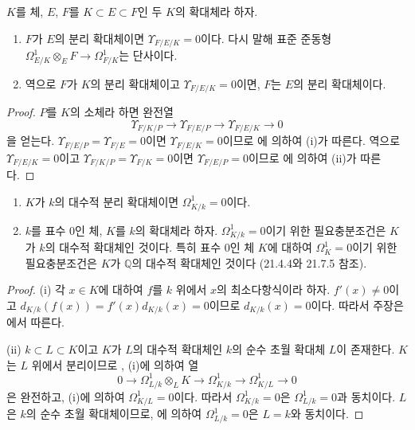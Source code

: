 \begin{corollary}[20.6.19]
\label{0.20.6.19-ko}
$K$를 체, $E$, $F$를 $K\subset E\subset F$인 두 $K$의
확대체라 하자.
\begin{enumerate}
  \item[\rm(i)] $F$가 $E$의 분리 확대체이면
  $\Upsilon_{F/E/K}=0$이다. 다시 말해 표준 준동형
  $\Omega^1_{E/K}\otimes_E F\to\Omega^1_{F/K}$는 단사이다.
  \item[\rm(ii)] 역으로 $F$가 $K$의 분리 확대체이고
  $\Upsilon_{F/E/K}=0$이면, $F$는 $E$의 분리 확대체이다.
\end{enumerate}
\end{corollary}

\begin{proof}
$P$를 $K$의 소체라 하면 완전열 
\[
  \Upsilon_{F/K/P}\longrightarrow\Upsilon_{F/E/P}
  \longrightarrow\Upsilon_{F/E/K}\longrightarrow0
\]
을 얻는다. $\Upsilon_{F/E/P}=\Upsilon_{F/E}=0$이면
$\Upsilon_{F/E/K}=0$이므로 에 의하여 (i)가
따른다. 역으로 $\Upsilon_{F/E/K}=0$이고
$\Upsilon_{F/K/P}=\Upsilon_{F/K}=0$이면
$\Upsilon_{F/E/P}=0$이므로 에 의하여 (ii)가
따른다.
\end{proof}

\begin{corollary}[20.6.20]
\label{0.20.6.20-ko}
\begin{enumerate}
  \item[\rm(i)] $K$가 $k$의 대수적 분리 확대체이면
  $\Omega^1_{K/k}=0$이다.
  \item[\rm(ii)] $k$를 표수 $0$인 체, $K$를 $k$의 확대체라 하자.
  $\Omega^1_{K/k}=0$이기 위한 필요충분조건은 $K$가 $k$의 대수적
  확대체인 것이다. 특히 표수 $0$인 체 $K$에 대하여
  $\Omega^1_K=0$이기 위한 필요충분조건은 $K$가 $\mathbb{Q}$의
  대수적 확대체인 것이다 (21.4.4와 21.7.5 참조).
\end{enumerate}
\end{corollary}

\begin{proof}
(i) 각 $x\in K$에 대하여 $f$를 $k$ 위에서 $x$의 최소다항식이라
하자. $f'(x)\ne0$이고
$d_{K/k}(f(x))=f'(x)d_{K/k}(x)=0$이므로 $d_{K/k}(x)=0$이다.
따라서 주장은 에서 따른다.

(ii) $k\subset L\subset K$이고 $K$가 $L$의 대수적 확대체인
$k$의 순수 초월 확대체 $L$이 존재한다. $K$는 $L$ 위에서
분리이므로 , (i)에 의하여 열
\[
  0\longrightarrow\Omega^1_{L/k}\otimes_L K
  \longrightarrow\Omega^1_{K/k}
  \longrightarrow\Omega^1_{K/L}\longrightarrow0
\]
은 완전하고, (i)에 의하여 $\Omega^1_{K/L}=0$이다. 따라서
$\Omega^1_{K/k}=0$은 $\Omega^1_{L/k}=0$과 동치이다. $L$은
$k$의 순수 초월 확대체이므로, 에 의하여
$\Omega^1_{L/k}=0$은 $L=k$와 동치이다.
\end{proof}

